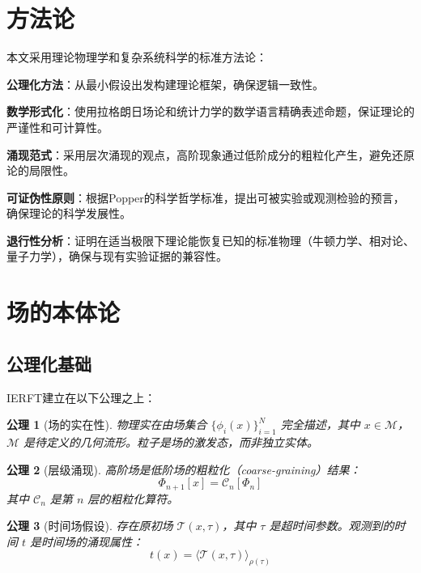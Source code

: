 \documentclass[12pt,a4paper]{article}
\newtheorem{axiom}{公理}
\begin{document}
\section{方法论}

本文采用理论物理学和复杂系统科学的标准方法论：

\textbf{公理化方法}：从最小假设出发构建理论框架，确保逻辑一致性。

\textbf{数学形式化}：使用拉格朗日场论和统计力学的数学语言精确表述命题，保证理论的严谨性和可计算性。

\textbf{涌现范式}：采用层次涌现的观点，高阶现象通过低阶成分的粗粒化产生，避免还原论的局限性。

\textbf{可证伪性原则}：根据Popper的科学哲学标准，提出可被实验或观测检验的预言，确保理论的科学发展性。

\textbf{退行性分析}：证明在适当极限下理论能恢复已知的标准物理（牛顿力学、相对论、量子力学），确保与现有实验证据的兼容性。

\section{场的本体论}

\subsection{公理化基础}

IERFT建立在以下公理之上：

\begin{axiom}[场的实在性]
物理实在由场集合 $\{\phi_i(x)\}_{i=1}^N$ 完全描述，其中 $x \in \mathcal{M}$，$\mathcal{M}$ 是待定义的几何流形。粒子是场的激发态，而非独立实体。
\end{axiom}

\begin{axiom}[层级涌现]
高阶场是低阶场的粗粒化（coarse-graining）结果：
\begin{equation}
\Phi_{n+1}[x] = \mathcal{C}_n[\Phi_n]
\end{equation}
其中 $\mathcal{C}_n$ 是第 $n$ 层的粗粒化算符。
\end{axiom}

\begin{axiom}[时间场假设]
存在原初场 $\mathcal{T}(x, \tau)$，其中 $\tau$ 是超时间参数。观测到的时间 $t$ 是时间场的涌现属性：
\begin{equation}
t(x) = \langle \mathcal{T}(x, \tau) \rangle_{\rho(\tau)}
\end{equation}
\end{axiom}
\end{document}
